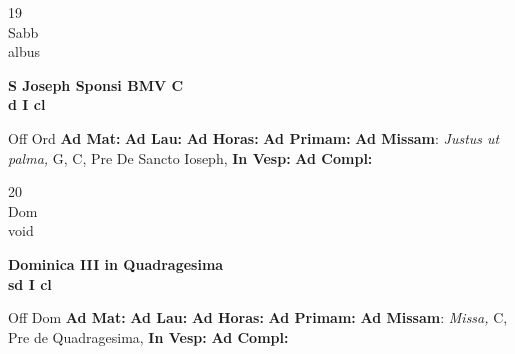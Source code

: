 \documentclass[10pt, openany]{book}
\begin{document}
    \begin{center}
        \begin{minipage}{3.5in}
            \vspace{2em}
            \begin{minipage}{0.5in}
                {\Huge 19} \\
                {\normalsize Sabb} \\
                {\normalsize albus}
            \end{minipage}
            \begin{minipage}{3.0in}
                \textbf{ \large S Joseph Sponsi BMV C \\
                \textnormal{\normalsize d I cl}} \\ 
            \end{minipage}
            \begin{justify}Off Ord
                \textbf{Ad Mat: }
                \textbf{Ad Lau: }
                \textbf{Ad Horas: }
                \textbf{Ad Primam: }\textbf{Ad Missam}: \textit{Justus ut palma,} G, C, Pre De Sancto Ioseph,  
                \textbf{In Vesp: }
                \textbf{Ad Compl: }
            \end{justify}
        \end{minipage}
    \end{center}

    \begin{center}
        \begin{minipage}{3.5in}
            \vspace{2em}
            \begin{minipage}{0.5in}
                {\Huge 20} \\
                {\normalsize Dom} \\
                {\normalsize void}
            \end{minipage}
            \begin{minipage}{3.0in}
                \textbf{ \large Dominica III in Quadragesima \\
                \textnormal{\normalsize sd I cl}} \\ 
            \end{minipage}
            \begin{justify}Off Dom
                \textbf{Ad Mat: }
                \textbf{Ad Lau: }
                \textbf{Ad Horas: }
                \textbf{Ad Primam: }\textbf{Ad Missam}: \textit{Missa,} C, Pre de Quadragesima,  
                \textbf{In Vesp: }
                \textbf{Ad Compl: }
            \end{justify}
        \end{minipage}
    \end{center}
\end{document}
